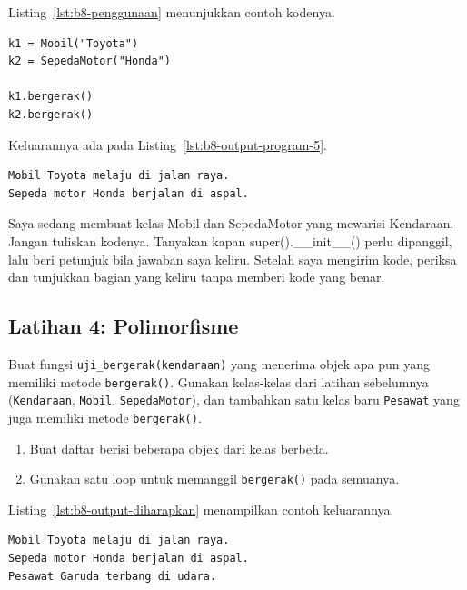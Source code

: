 Listing~\ref{lst:b8-penggunaan} menunjukkan contoh kodenya.

\begin{lstlisting}[style=PythonStyle, caption={Contoh penggunaan}, label={lst:b8-penggunaan}]
k1 = Mobil("Toyota")
k2 = SepedaMotor("Honda")

k1.bergerak()
k2.bergerak()
\end{lstlisting}

Keluarannya ada pada Listing~\ref{lst:b8-output-program-5}.

\begin{lstlisting}[language=bash, caption={Output Program}, label={lst:b8-output-program-5}]
Mobil Toyota melaju di jalan raya.
Sepeda motor Honda berjalan di aspal.
\end{lstlisting}

\begin{promptterarah}
Saya sedang membuat kelas Mobil dan SepedaMotor yang mewarisi Kendaraan. Jangan tuliskan kodenya. Tanyakan kapan super().\_\_init\_\_() perlu dipanggil, lalu beri petunjuk bila jawaban saya keliru. Setelah saya mengirim kode, periksa dan tunjukkan bagian yang keliru tanpa memberi kode yang benar.
\end{promptterarah}

\subsection*{Latihan 4: Polimorfisme}
Buat fungsi \texttt{uji\_bergerak(kendaraan)} yang menerima objek apa pun yang memiliki metode \texttt{bergerak()}.  
Gunakan kelas-kelas dari latihan sebelumnya (\texttt{Kendaraan}, \texttt{Mobil}, \texttt{SepedaMotor}), dan tambahkan satu kelas baru \texttt{Pesawat} yang juga memiliki metode \texttt{bergerak()}.

\begin{enumerate}
    \item Buat daftar berisi beberapa objek dari kelas berbeda.
    \item Gunakan satu loop untuk memanggil \texttt{bergerak()} pada semuanya.
\end{enumerate}

Listing~\ref{lst:b8-output-diharapkan} menampilkan contoh keluarannya.

\begin{lstlisting}[language=bash, caption={Output yang Diharapkan}, label={lst:b8-output-diharapkan}]
Mobil Toyota melaju di jalan raya.
Sepeda motor Honda berjalan di aspal.
Pesawat Garuda terbang di udara.
\end{lstlisting}

